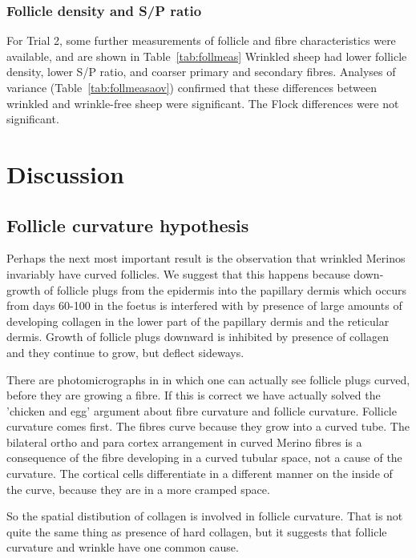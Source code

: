 \documentclass{article}
\begin{document}
\subsubsection{Follicle density and S/P ratio}
For Trial 2, some further measurements of follicle and fibre characteristics were available, and are shown in Table~\ref{tab:follmeas}
%
Wrinkled sheep had lower follicle density, lower S/P ratio, and coarser primary and secondary fibres.  Analyses of variance (Table~\ref{tab:follmeasaov}) confirmed that these differences between wrinkled and wrinkle-free sheep were significant. The Flock differences were not significant.
%


\section{Discussion}
 
\subsection{Follicle curvature hypothesis}
Perhaps the next most important result is the observation that wrinkled Merinos invariably have curved follicles. We suggest that this happens because down-growth of follicle plugs from the epidermis into the papillary dermis which occurs from days 60-100 in the foetus is interfered with by presence of large amounts of developing collagen in the lower part of the papillary dermis and the reticular dermis. Growth of follicle plugs downward is inhibited by presence of collagen and they continue to grow, but deflect sideways.

There are photomicrographs in \cite{hardy-1956} in which one can actually see follicle plugs curved, before they are growing a fibre. If this is correct we have actually solved the 'chicken and egg' argument about fibre curvature and follicle curvature. Follicle curvature comes first. The fibres curve because they grow into a curved tube. The bilateral ortho and para cortex arrangement in curved Merino fibres is a consequence of the fibre developing in a curved tubular space, not a cause of the curvature. The cortical cells differentiate in a different manner on the inside of the curve, because they are in a more cramped space.

So the spatial distibution of collagen is involved in follicle curvature. That is not quite the same thing as presence of hard collagen, but it suggests that follicle curvature and wrinkle have one common cause.
\end{document}
